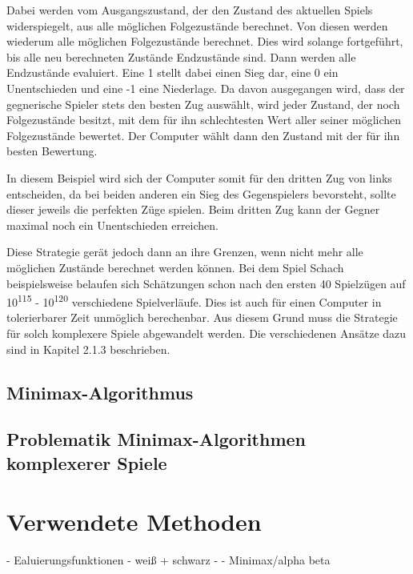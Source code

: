Dabei werden vom Ausgangszustand, der den Zustand des aktuellen Spiels widerspiegelt, aus alle möglichen Folgezustände berechnet. Von diesen werden wiederum alle möglichen Folgezustände berechnet. Dies wird solange fortgeführt, bis alle neu berechneten Zustände Endzustände sind. Dann werden alle Endzustände evaluiert. Eine 1 stellt dabei einen Sieg dar, eine 0 ein Unentschieden und eine -1 eine Niederlage. Da davon ausgegangen wird, dass der gegnerische Spieler stets den besten Zug auswählt, wird jeder Zustand, der noch Folgezustände besitzt, mit dem für ihn schlechtesten Wert aller seiner möglichen Folgezustände bewertet. Der Computer wählt dann den Zustand mit der für ihn besten Bewertung.

In diesem Beispiel wird sich der Computer somit für den dritten Zug von links entscheiden, da bei beiden anderen ein Sieg des Gegenspielers bevorsteht, sollte dieser jeweils die perfekten Züge spielen. Beim dritten Zug kann der Gegner maximal noch ein Unentschieden erreichen.

Diese Strategie gerät jedoch dann an ihre Grenzen, wenn nicht mehr alle möglichen Zustände berechnet werden können. Bei dem Spiel Schach beispielsweise belaufen sich Schätzungen schon nach den ersten 40 Spielzügen auf 10\textsuperscript{115} - 10\textsuperscript{120} verschiedene Spielverläufe. Dies ist auch für einen Computer in tolerierbarer  Zeit unmöglich berechenbar. Aus diesem Grund muss die Strategie für solch komplexere Spiele abgewandelt werden. Die verschiedenen Ansätze dazu sind in Kapitel 2.1.3 beschrieben.



\subsection{Minimax-Algorithmus}


\subsection{Problematik Minimax-Algorithmen komplexerer Spiele}



   
   



\section{Verwendete Methoden}
- Ealuierungsfunktionen - weiß + schwarz -
- Minimax/alpha beta
